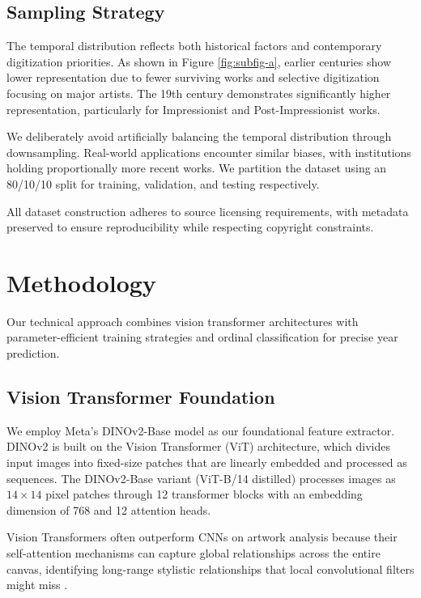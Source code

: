 \documentclass[10pt,twocolumn,letterpaper]{article}
\begin{document}
\subsection{Sampling Strategy}

The temporal distribution reflects both historical factors and contemporary digitization priorities. As shown in Figure \ref{fig:subfig-a}, earlier centuries show lower representation due to fewer surviving works and selective digitization focusing on major artists. The 19th century demonstrates significantly higher representation, particularly for Impressionist and Post-Impressionist works.

We deliberately avoid artificially balancing the temporal distribution through downsampling. Real-world applications encounter similar biases, with institutions holding proportionally more recent works.
We partition the dataset using an 80/10/10 split for training, validation, and testing respectively.

All dataset construction adheres to source licensing requirements, with metadata preserved to ensure reproducibility while respecting copyright constraints.

\section{Methodology}

Our technical approach combines vision transformer architectures with parameter-efficient training strategies and ordinal classification for precise year prediction.

\subsection{Vision Transformer Foundation}

We employ Meta's DINOv2-Base model \cite{Oquab23} as our foundational feature extractor. DINOv2 is built on the Vision Transformer (ViT) architecture, which divides input images into fixed-size patches that are linearly embedded and processed as sequences. The DINOv2-Base variant (ViT-B/14 distilled) processes images as $14\times14$ pixel patches through 12 transformer blocks with an embedding dimension of 768 and 12 attention heads.

Vision Transformers often outperform CNNs on artwork analysis because their self-attention mechanisms can capture global relationships across the entire canvas, identifying long-range stylistic relationships that local convolutional filters might miss \cite{Dosovitskiy20ViT, Oquab23}.
\end{document}
